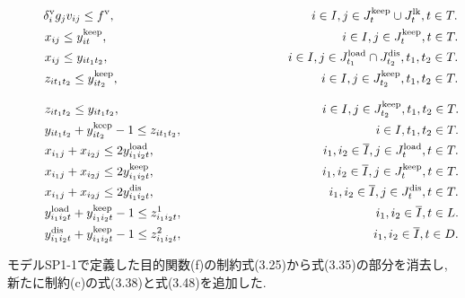 \begin{center}
\begin{align}
&\hspace{2.9em} {\delta_{i}^{\rm{v}}}{g_{j}} {v_{ij}} \leq f^{\rm{v}}, \hspace{16.00em} i \in I, j \in J_{t}^{\rm{keep}} \cup J_{t}^{\rm{lk}}, t \in T. \\
&\hspace{3.0em} {x_{ij}} \leq {y_{it}^{\rm{keep}}}, \hspace{19.11em} i \in I, j \in J_{t}^{\rm{keep}}, t \in T. \\
&\hspace{3.0em} {x_{ij}} \leq {y_{it_1t_2}}, \hspace{14.61em} i \in I, j \in J_{t_1}^{\rm{load}} \cap J_{t_2}^{\rm{dis}}, {t_1},{t_2} \in T. \\
&\hspace{3.0em} {z_{it_1t_2}} \leq {y_{it_2}^{\rm{keep}}} ,  \hspace{16.50em} i \in I, j \in J_{t_2}^{\rm{keep}}, t_1,t_2 \in T.
\end{align}
\end{center}


\begin{center}
\begin{align}
&\hspace{3.0em} {z_{it_1t_2}} \leq {y_{it_1t_2}} ,  \hspace{16.49em} i \in I, j \in J_{t_2}^{\rm{keep}}, t_1,t_2 \in T. \\
&\hspace{3.0em} {y_{it_1t_2}} + y_{it_2}^{\rm{keep}} - 1 \leq {z_{it_1t_2}}, \hspace{15.79em} i \in I, t_1,t_2 \in T. \\
&\hspace{3.0em} {x_{i_1j}} + {x_{i_2j}} \leq 2{y_{i_1i_2t}^{\rm{load}}}, \hspace{13.71em} i_1, i_2 \in \overline{I}, j \in J_{t}^{\rm{load}}, t \in T. \\
&\hspace{3.0em} {x_{i_1j}} + {x_{i_2j}} \leq 2{y_{i_1i_2t}^{\rm{keep}}}, \hspace{13.64em} i_1, i_2 \in \overline{I}, j \in J_{t}^{\rm{keep}}, t \in T. \\
&\hspace{3.0em} {x_{i_1j}} + {x_{i_2j}} \leq 2{y_{i_1i_2t}^{\rm{dis}}}, \hspace{14.19em} i_1, i_2 \in \overline{I}, j \in J_{t}^{\rm{dis}}, t \in T. \\
&\hspace{3.0em} {y_{i_1i_2t}^{\rm{load}}} + y_{i_1i_2t}^{\rm{keep}} - 1 \leq {z_{i_1i_2t}^1}, \hspace{15.77em}  i_1, i_2 \in \overline{I}, t \in L. \\
&\hspace{3.0em} {y_{i_1i_2t}^{\rm{dis}}} + y_{i_1i_2t}^{\rm{keep}} - 1 \leq {z_{i_1i_2t}^2}, \hspace{15.58em}  i_1, i_2 \in \overline{I}, t \in D.
\end{align}
\end{center}

モデルSP1-1で定義した目的関数(f)の制約式(3.25)から式(3.35)の部分を消去し, 新たに制約(c)の式(3.38)と式(3.48)を追加した.

